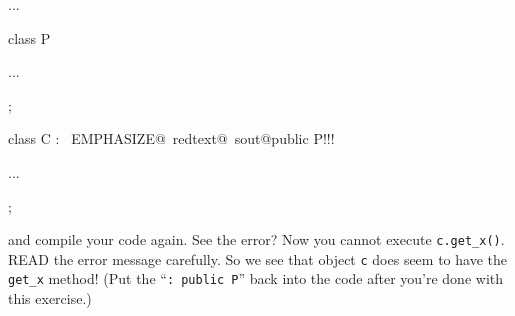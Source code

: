 \begin{console}[commandchars=\~\@\!]

...

class P

{

      ...

};

class C : ~EMPHASIZE@~redtext@~sout@public P!!!

{     

      ...

};

\end{console}

and compile your code again. See the error? Now you cannot execute \verb!c.get_x()!. READ the error message carefully. So we see that object \verb!c! does seem to have the \verb!get_x! method! (Put the ``\verb!: public P!'' back into the code after you're done with this exercise.)

